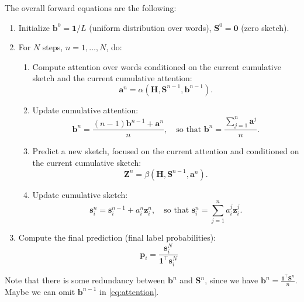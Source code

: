 \documentclass[10pt,a4paper]{article}
\newcommand{\vect}[1]{\mathbf{#1}}
\newcommand{\matr}[1]{\mathbf{#1}}
\newcommand{\vectsymb}[1]{\boldsymbol{#1}}
\newcommand{\z}{{\vectsymb{z}}}
\newcommand{\sss}{{\vectsymb{s}}}
\newcommand{\aaa}{{\vectsymb{a}}}
\newcommand{\bb}{{\vectsymb{b}}}
\newcommand{\Z}{{\matr{Z}}}
\newcommand{\HH}{{\matr{H}}}
\newcommand{\SSS}{{\matr{S}}}
\begin{document}
The overall forward equations are the following:
\begin{enumerate}
\item Initialize $\bb^{0} = \vect{1}/L$ (uniform distribution over words), 
$\SSS^{0} = \vect{0}$ (zero sketch).
\item For $N$ steps, $n=1,\ldots,N$, do:
\begin{enumerate}
\item Compute attention over words conditioned on the current cumulative sketch and the current cumulative attention:
\begin{equation}\label{eq:attention}
\aaa^{n} = \alpha(\HH, \SSS^{n-1}, \bb^{n-1}).
\end{equation}
\item Update cumulative attention:
\begin{equation}
\bb^{n} = \frac{(n-1) \bb^{n-1} + \aaa^n}{n}, \quad \text{so that $\bb^{n} = \frac{\sum_{j=1}^n \aaa^j}{n}$}.
\end{equation}
\item Predict a new sketch, focused on the current attention and conditioned on the current cumulative sketch:
\begin{equation}
\Z^{n} = \beta(\HH, \SSS^{n-1}, \aaa^{n}).
\end{equation}
\item Update cumulative sketch:
\begin{equation}
\sss^{n}_i = \sss^{n-1}_i + a^n_i \z^n_i, \quad \text{so that $\sss^{n}_i = \sum_{j=1}^n a^{j}_i \z^{j}_i$}.
\end{equation}
\end{enumerate}
\item Compute the final prediction (final label probabilities):
\begin{equation}
\vectsymb{p}_i = \frac{\sss^{N}_i}{\vect{1}^{\top}\sss^{N}_i}
\end{equation}
\end{enumerate}

Note that there is some redundancy between $\bb^n$ and $\SSS^{n}$, 
since we have $\bb^n = \frac{\vect{1}^{\top}\SSS^n}{n}$. Maybe we can omit 
$\bb^{n-1}$ in \eqref{eq:attention}.






\end{document}
